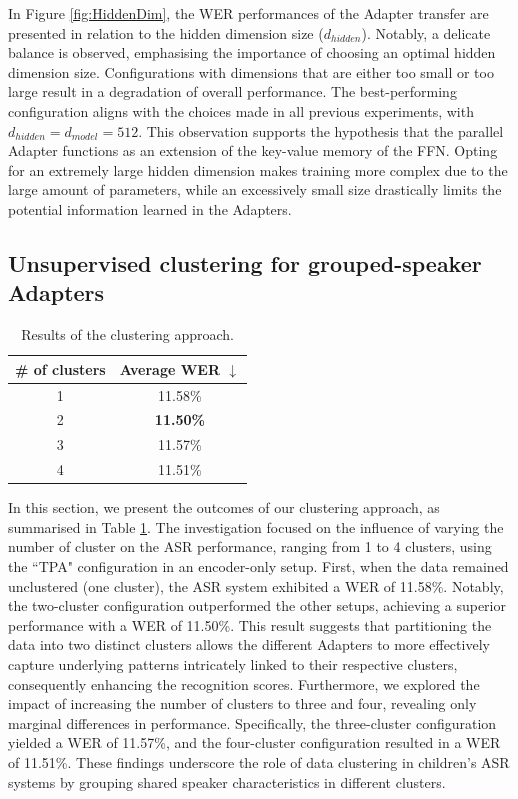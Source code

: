 In Figure \ref{fig:HiddenDim}, the WER performances of the Adapter transfer are presented in relation to the hidden dimension size ($d_{hidden}$). Notably, a delicate balance is observed, emphasising the importance of choosing an optimal hidden dimension size. Configurations with dimensions that are either too small or too large result in a degradation of overall performance. The best-performing configuration aligns with the choices made in all previous experiments, with $d_{hidden} = d_{model} = 512$. This observation supports the hypothesis that the parallel Adapter functions as an extension of the key-value memory of the FFN. Opting for an extremely large hidden dimension makes training more complex due to the large amount of parameters, while an excessively small size drastically limits the potential information learned in the Adapters. 

\subsection{Unsupervised clustering for grouped-speaker Adapters}
\begin{table}[t]
\caption{Results of the clustering approach.}
\begin{center}    
\begin{tabular}{cc}
\hline
  \# of clusters & Average WER $\downarrow$    \\ \hline
\multicolumn{1}{c}{1} & 11.58\%  \\%
\multicolumn{1}{c}{2} & \textbf{11.50\%}  \\
\multicolumn{1}{c}{3} & 11.57\%  \\
\multicolumn{1}{c}{4} & 11.51\%  \\ \hline 

\end{tabular}
\end{center}

\label{tab:res_clusters}
\end{table}

In this section, we present the outcomes of our clustering approach, as summarised in Table \ref{tab:res_clusters}. The investigation focused on the influence of varying the number of cluster on the ASR performance, ranging from 1 to 4 clusters, using the ``TPA" configuration in an encoder-only setup. First, when the data remained unclustered (one cluster), the ASR system exhibited a 
WER of 11.58\%. Notably, the two-cluster configuration outperformed the other setups, achieving a superior performance with a WER of 11.50\%. This result suggests that partitioning the data into two distinct clusters allows the different Adapters to more effectively capture underlying patterns intricately linked to their respective clusters, consequently enhancing the recognition scores.
Furthermore, we explored the impact of increasing the number of clusters to three and four, revealing only marginal differences in performance. Specifically, the three-cluster configuration yielded a WER of 11.57\%, and the four-cluster configuration resulted in a WER of 11.51\%. These findings underscore the role of data clustering in children's ASR systems by grouping shared speaker characteristics in different clusters.

